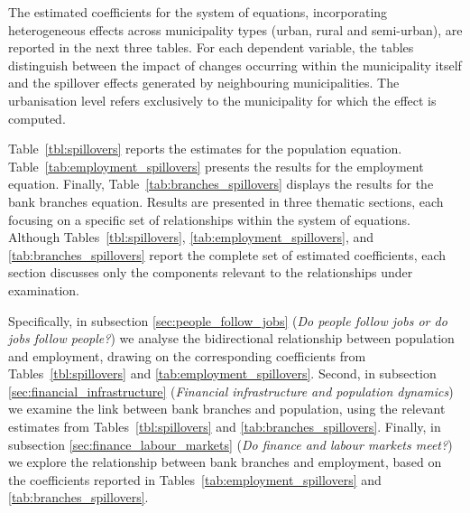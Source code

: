 \documentclass[a4paper,11pt,oneside]{article}
\begin{document}
{


The estimated coefficients for the system of equations, incorporating heterogeneous effects across municipality types (urban, rural and semi-urban), are reported in the next three tables. For each dependent variable, the tables distinguish between the impact of changes occurring within the municipality itself and the spillover effects generated by neighbouring municipalities. The urbanisation level refers exclusively to the municipality for which the effect is computed.


\color{black}



Table~\ref{tbl:spillovers} reports the estimates for the population equation. Table~\ref{tab:employment_spillovers} presents the results for the employment equation. Finally, Table~\ref{tab:branches_spillovers} displays the results for the bank branches equation. Results are presented in three thematic sections, each focusing on a specific set of relationships within the system of equations. Although Tables~\ref{tbl:spillovers}, \ref{tab:employment_spillovers}, and \ref{tab:branches_spillovers} report the complete set of estimated coefficients, each section discusses only the components relevant to the relationships under examination.



Specifically, in subsection \ref{sec:people_follow_jobs} (\textit{Do people follow jobs or do jobs follow people?}) we analyse the bidirectional relationship between population and employment, drawing on the corresponding coefficients from Tables~\ref{tbl:spillovers} and \ref{tab:employment_spillovers}. Second, in subsection \ref{sec:financial_infrastructure} (\textit{Financial infrastructure and population dynamics}) we examine the link between bank branches and population, using the relevant estimates from Tables~\ref{tbl:spillovers} and \ref{tab:branches_spillovers}. Finally, in subsection \ref{sec:finance_labour_markets} (\textit{Do finance and labour markets meet?}) we explore the relationship between bank branches and employment, based on the coefficients reported in Tables~\ref{tab:employment_spillovers} and \ref{tab:branches_spillovers}.


}



\end{document}
